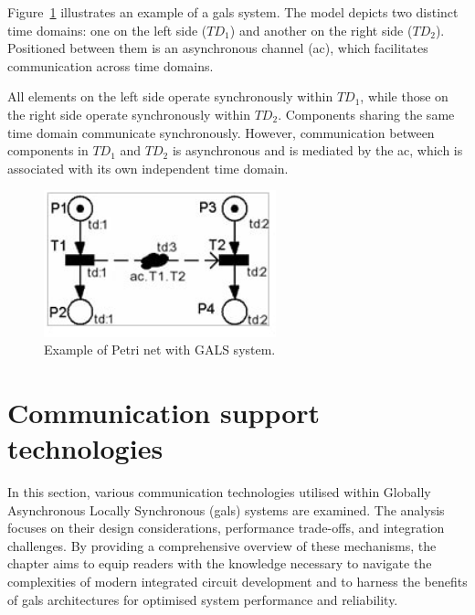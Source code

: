 Figure~\ref{fig:petrigals} illustrates an example of a \gls{gals} system. The model depicts two distinct time domains: one on the left side (\( TD_1 \)) and another on the right side (\( TD_2 \)). Positioned between them is an asynchronous channel (\gls{ac}), which facilitates communication across time domains. 

All elements on the left side operate synchronously within \( TD_1 \), while those on the right side operate synchronously within \( TD_2 \). Components sharing the same time domain communicate synchronously. However, communication between components in \( TD_1 \) and \( TD_2 \) is asynchronous and is mediated by the \gls{ac}, which is associated with its own independent time domain.




\begin{figure}[htbp]
  \centering
  \includegraphics[width=0.6\textwidth]{Chapters/Figures/petrigals.jpg}
  \caption{Example of Petri net with GALS system.}
  \label{fig:petrigals}
\end{figure}


%
%
%
%
%

\section{Communication support technologies}
\label{sec:communication_support_technologies}

In this section, various communication technologies utilised within Globally Asynchronous Locally Synchronous (\gls{gals}) systems are examined. The analysis focuses on their design considerations, performance trade-offs, and integration challenges. By providing a comprehensive overview of these mechanisms, the chapter aims to equip readers with the knowledge necessary to navigate the complexities of modern integrated circuit development and to harness the benefits of \gls{gals} architectures for optimised system performance and reliability.


